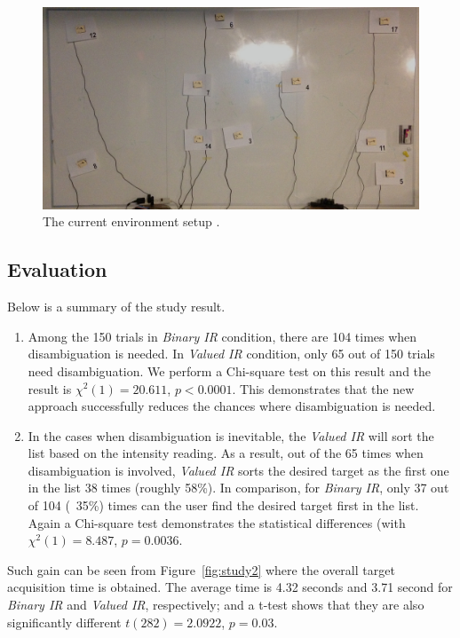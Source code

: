 \begin{figure}[t]
\centering
\includegraphics[width=0.9\columnwidth]{figures/study-layout2.jpg}
\caption{The current environment setup .}
\label{fig:study-layout2}
\end{figure}

\subsection{Evaluation}
Below is a summary of the study result.
\begin{enumerate}
\item Among the 150 trials in {\em Binary IR} condition, there are 104 times when disambiguation is needed. In {\em Valued IR} condition, only 65 out of 150 trials need disambiguation. We perform a Chi-square test on this result and the result is $\chi^2(1) = 20.611$, $p < 0.0001$.  This demonstrates that the new approach successfully reduces the chances where disambiguation is needed.
\item In the cases when disambiguation is inevitable, the {\em Valued IR} will sort the list based on the intensity reading. As a result, out of the 65 times when disambiguation is involved, {\em Valued IR} sorts the desired target as the first one in the list 38 times (roughly 58\%). In comparison, for {\em Binary IR}, only 37 out of 104 (~35\%) times can the user find the desired target first in the list. Again a Chi-square test demonstrates the statistical differences (with $\chi^2(1) = 8.487$, $p = 0.0036$. 
\end{enumerate}

Such gain can be seen from Figure~\ref{fig:study2} where the overall target acquisition time is obtained. The average time is 4.32 seconds and 3.71 second for {\em Binary IR} and {\em Valued IR}, respectively; and a t-test shows that they are also significantly different $t(282)=2.0922$, $p=0.03$.


